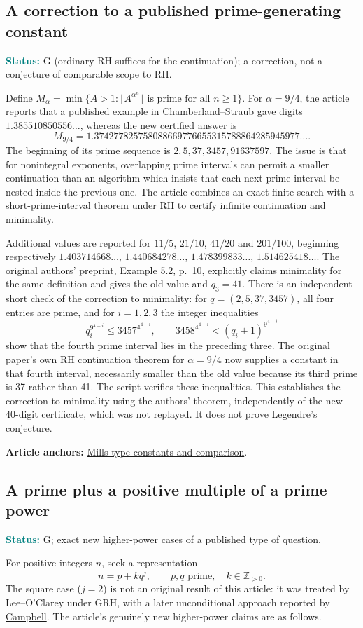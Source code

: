 \documentclass[11pt]{article}
\newcommand{\art}[3]{\href{https://github.com/VladimirReshetnikov/ProveIt/blob/3c4d27a69c98d09319a51e41a19fca05bb80a3e2/Analysis/GeneralizedRiemannHypothesis/Article/sections/#1.tex\#L#2}{#3}}
\newcommand{\status}[1]{\par\smallskip\noindent\textcolor{teal}{\textbf{Status:}} #1\par\smallskip}
\newcommand{\sources}[1]{\par\smallskip\noindent\textbf{Article anchors:} #1\par}
\newcommand{\Z}{\mathbb Z}
\begin{document}
\subsection{A correction to a published prime-generating constant}
\status{G (ordinary RH suffices for the continuation); a correction, not a conjecture of comparable scope to RH.}
Define $M_\alpha=\min\{A>1:\lfloor A^{\alpha^n}\rfloor\text{ is prime for all }n\ge1\}$. For $\alpha=9/4$, the article reports that a published example in \href{https://arminstraub.com/pub/legendre-riemann}{Chamberland--Straub} gave digits $1.385510850556\ldots$, whereas the new certified answer is
\[
 M_{9/4}=1.374277825758088669776655315788864285945977\ldots.
\]
The beginning of its prime sequence is $2,5,37,3457,91637597$. The issue is that for nonintegral exponents, overlapping prime intervals can permit a smaller continuation than an algorithm which insists that each next prime interval be nested inside the previous one. The article combines an exact finite search with a short-prime-interval theorem under RH to certify infinite continuation and minimality.

Additional values are reported for $11/5$, $21/10$, $41/20$ and $201/100$, beginning respectively $1.403714668\ldots$, $1.440684278\ldots$, $1.478399833\ldots$, $1.514625418\ldots$. The original authors' preprint, \href{https://arminstraub.com/downloads/pub/legendre-riemann.pdf#page=10}{Example 5.2, p.~10}, explicitly claims minimality for the same definition and gives the old value and $q_3=41$. There is an independent short check of the correction to minimality: for $q=(2,5,37,3457)$, all four entries are prime, and for $i=1,2,3$ the integer inequalities
\[
 q_i^{9^{4-i}}\le 3457^{4^{4-i}},\qquad
 3458^{4^{4-i}}<(q_i+1)^{9^{4-i}}
\]
show that the fourth prime interval lies in the preceding three. The original paper's own RH continuation theorem for $\alpha=9/4$ now supplies a constant in that fourth interval, necessarily smaller than the old value because its third prime is 37 rather than 41. The script verifies these inequalities. This establishes the correction to minimality using the authors' theorem, independently of the new 40-digit certificate, which was not replayed. It does not prove Legendre's conjecture.
\sources{\art{dir}{835}{Mills-type constants and comparison}.}
\clearpage
\subsection{A prime plus a positive multiple of a prime power}\label{namedend}
\status{G; exact new higher-power cases of a published type of question.}
For positive integers $n$, seek a representation
\[
 n=p+kq^j,\qquad p,q\text{ prime},\quad k\in\Z_{>0}.
\]
The square case ($j=2$) is not an original result of this article: it was treated by Lee--O'Clarey under GRH, with a later unconditional approach reported by \href{https://arxiv.org/abs/2609.14714}{Campbell}. The article's genuinely new higher-power claims are as follows.
\end{document}
